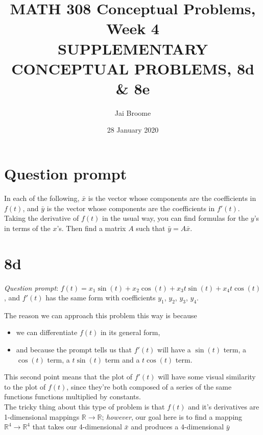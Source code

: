 \documentclass[12pt]{article}
\title{MATH 308 Conceptual Problems, Week 4 \vspace{1em}\\\normalsize{SUPPLEMENTARY CONCEPTUAL PROBLEMS, 8d \& 8e}}
\author{Jai Broome}
\date{28 January 2020}
\begin{document}

\maketitle

\section{Question prompt}

In each of the following, $\bar{x}$ is the vector whose components are the coefficients
in $f(t)$, and $\bar{y}$ is the vector whose components are the coefficients in $f'(t)$. Taking
the derivative of $f(t)$ in the usual way, you can find formulas for the $y$'s in terms
of the $x$'s. Then find a matrix $A$ such that $\bar{y}=A\bar{x}$.

\section{8d}
\textit{Question prompt}: $f(t) = x_1\sin(t) + x_2\cos(t) + x_3t\sin(t) + x_4t\cos(t)$,
and $f'(t)$ has the same form with coefficients $y_1$, $y_2$, $y_3$, $y_4$.

The reason we can approach this problem this way is because
\begin{itemize}
  \item we can differentiate $f(t)$ in its general form, 
  \item and because the prompt tells us that $f'(t)$ will have a $\sin(t)$ term,
    a $\cos(t)$ term, a $t\sin(t)$ term and a $t\cos(t)$ term.
\end{itemize}

This second point means that the plot of $f'(t)$ will have some visual
similarity to the plot of $f(t)$, since they're both composed of a series of
the same functions functions multiplied by constants. \\

The tricky thing about this type of problem is that $f(t)$ and it's derivatives are 1-dimensional
mappings $\mathbb{R} \rightarrow \mathbb{R}$; \textit{however}, our goal here is to find a mapping
$\mathbb{R}^4 \rightarrow \mathbb{R}^4$ that takes our 4-dimensional $\bar{x}$ and produces a
4-dimensional $\bar{y}$
\end{document}
